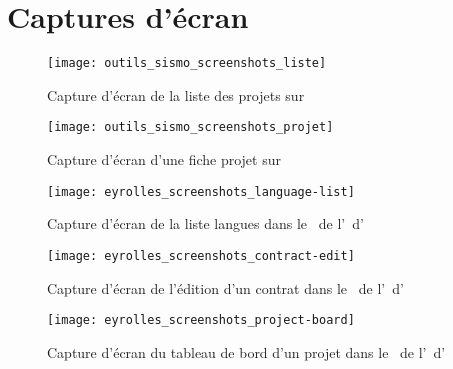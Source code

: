 \appendix

\chapter{Captures d'écran}

\begin{figure}[h]
	\centering
	\texttt{[image: outils\_sismo\_screenshots\_liste]}
	\caption{Capture d'écran de la liste des projets sur \asismo}
	\label{figure:outils_sismo_screenshots_liste}
\end{figure}

\begin{figure}[h]
	\centering
	\texttt{[image: outils\_sismo\_screenshots\_projet]}
	\caption{Capture d'écran d'une fiche projet sur \asismo}
	\label{figure:outils_sismo_screenshots_projet}
\end{figure}

\begin{figure}[h]
	\centering
	\texttt{[image: eyrolles\_screenshots\_language-list]}
	\caption{Capture d'écran de la liste langues dans le \alotdeux\ de l'\aintranet\ d'\aey}
	\label{figure:eyrolles_screenshots_language-list}
\end{figure}

\begin{figure}[h]
	\centering
	\texttt{[image: eyrolles\_screenshots\_contract-edit]}
	\caption{Capture d'écran de l'édition d'un contrat dans le \alotdeux\ de l'\aintranet\ d'\aey}
	\label{figure:eyrolles_screenshots_contract-edit}
\end{figure}

\begin{figure}[h]
	\centering
	\texttt{[image: eyrolles\_screenshots\_project-board]}
	\caption{Capture d'écran du tableau de bord d'un projet dans le \alotdeux\ de l'\aintranet\ d'\aey}
	\label{figure:eyrolles_screenshots_project-board}
\end{figure}
